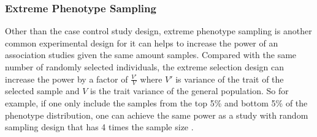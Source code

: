 	\subsubsection{Extreme Phenotype Sampling}
	Other than the case control study design, extreme phenotype sampling is another common experimental design for it can helps to increase the power of an association studies given the same amount samples.
	Compared with the same number of randomly selected individuals, the extreme selection design can increase the power by a factor of $\frac{V'}{V}$ where $V'$ is variance of the trait of the selected sample and $V$ is the trait variance of the general population.
	So for example, if one only include the samples from the top 5\% and bottom 5\% of the phenotype distribution, one can achieve the same power as a study with random sampling design that has 4 times the sample size \citep{Sham2014}. 
	
